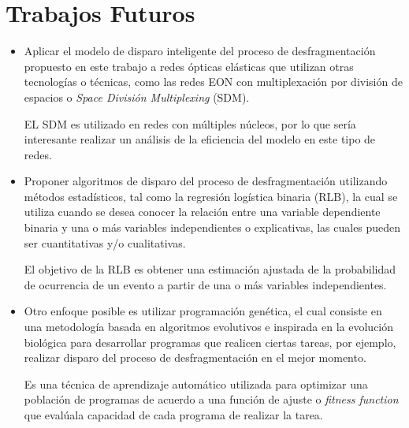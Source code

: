 \section{Trabajos Futuros}
\begin{itemize}
    \item Aplicar el modelo de disparo inteligente del proceso de desfragmentación propuesto en este trabajo a redes ópticas elásticas que utilizan otras tecnologías o técnicas, como las redes EON con multiplexación por división de espacios o \textit{Space División Multiplexing} (SDM).
    
    EL SDM es utilizado en redes con múltiples núcleos, por lo que sería interesante realizar un análisis de la eficiencia del modelo en este tipo de redes.
    
    \item Proponer algoritmos de disparo del proceso de desfragmentación utilizando métodos estadísticos, tal como la regresión logística binaria (RLB), la cual se utiliza cuando se desea conocer la relación entre una variable dependiente binaria y una o más variables independientes o explicativas, las cuales pueden ser cuantitativas y/o cualitativas.
    
    El objetivo de la RLB es obtener una estimación ajustada de la probabilidad de ocurrencia de un evento a partir de una o más variables independientes.
    
    \item Otro enfoque posible es utilizar programación genética, el cual consiste en una metodología basada en algoritmos evolutivos e inspirada en la evolución biológica para desarrollar programas que realicen ciertas tareas, por ejemplo, realizar disparo del proceso de desfragmentación en el mejor momento.
    
    Es una técnica de aprendizaje automático utilizada para optimizar una población de programas de acuerdo a una función de ajuste o \textit{fitness function} que evalúala capacidad de cada programa de realizar la tarea.
\end{itemize}
	
	
	
